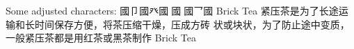 
\begin{multicols}{2}
Some adjusted characters:
{}
{}
{}
{}
{}
{}
{\cjk{}國{卩}國{\cnxBabel{}癶}國{\cnxJzr{}}國{\cnxJzr{}}國{乛}國} Brick Tea {\cjk{}紧压茶是为了长途运输和长时间保存方便，将茶压缩干燥，压成方砖}
{\cjk{}状或块状，为了防止途中变质，一般紧压茶都是用红茶或黑茶制作} Brick Tea
\end{multicols}
